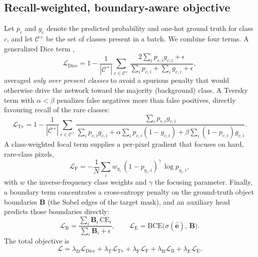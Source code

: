 \documentclass[review]{elsarticle}
\begin{document}
\subsection{Recall-weighted, boundary-aware objective}\label{sec:loss}
Let $p_{c}$ and $g_{c}$ denote the predicted probability and one-hot ground truth for class
$c$, and let $\mathcal{C}^{+}$ be the set of classes present in a batch. We combine four
terms. A generalized Dice term \citep{sudre2017generaliseddice},
\begin{equation}
\mathcal{L}_{\mathrm{Dice}} = 1 - \frac{1}{|\mathcal{C}^{+}|}\sum_{c\in\mathcal{C}^{+}}
\frac{2\sum_i p_{c,i} g_{c,i} + \epsilon}{\sum_i p_{c,i} + \sum_i g_{c,i} + \epsilon},
\label{eq:dice}
\end{equation}
averaged \emph{only over present classes} to avoid a spurious penalty that would otherwise
drive the network toward the majority (background) class. A Tversky term
\citep{salehi2017tversky} with $\alpha<\beta$ penalizes false negatives more than false
positives, directly favouring recall of the rare classes:
\begin{equation}
\mathcal{L}_{\mathrm{Tv}} = 1 - \frac{1}{|\mathcal{C}^{+}|}\sum_{c\in\mathcal{C}^{+}}
\frac{\sum_i p_{c,i} g_{c,i}}
     {\sum_i p_{c,i} g_{c,i} + \alpha\sum_i p_{c,i}(1-g_{c,i}) + \beta\sum_i (1-p_{c,i}) g_{c,i}}.
\label{eq:tversky}
\end{equation}
A class-weighted focal term \citep{lin2020focal} supplies a per-pixel gradient that focuses
on hard, rare-class pixels,
\begin{equation}
\mathcal{L}_{\mathrm{F}} = -\frac{1}{N}\sum_{i} w_{y_i}\, (1-p_{y_i,i})^{\gamma}\, \log p_{y_i,i},
\label{eq:focal}
\end{equation}
with $w$ the inverse-frequency class weights and $\gamma$ the focusing parameter. Finally, a
boundary term concentrates a cross-entropy penalty on the ground-truth object boundaries
$\mathbf{B}$ (the Sobel edges of the target mask), and an auxiliary head predicts those
boundaries directly:
\begin{equation}
\mathcal{L}_{\mathrm{B}} = \frac{\sum_i \mathbf{B}_i\, \mathrm{CE}_i}{\sum_i \mathbf{B}_i + \epsilon},
\qquad
\mathcal{L}_{\mathrm{E}} = \mathrm{BCE}\big(\sigma(\hat{\mathbf{e}}),\, \mathbf{B}\big).
\label{eq:boundary}
\end{equation}
The total objective is
\begin{equation}
\mathcal{L} = \lambda_{\mathrm{D}}\mathcal{L}_{\mathrm{Dice}}
            + \lambda_{\mathrm{T}}\mathcal{L}_{\mathrm{Tv}}
            + \lambda_{\mathrm{F}}\mathcal{L}_{\mathrm{F}}
            + \lambda_{\mathrm{B}}\mathcal{L}_{\mathrm{B}}
            + \lambda_{\mathrm{E}}\mathcal{L}_{\mathrm{E}}.
\label{eq:total}
\end{equation}
\end{document}
